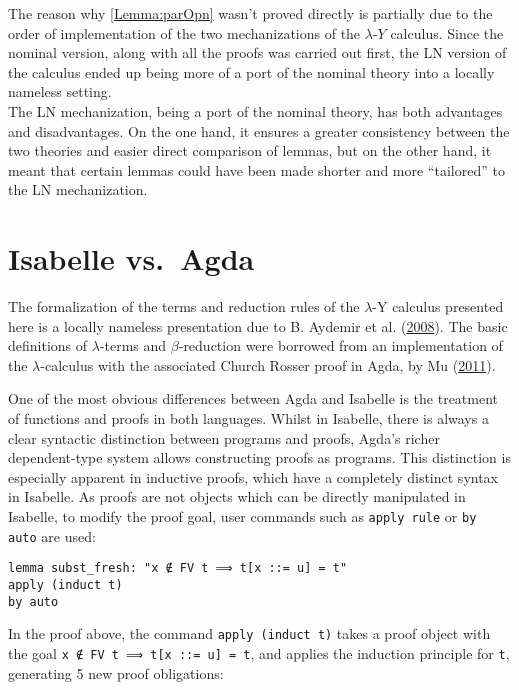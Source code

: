 \documentclass[a4paper, 12pt, twoside]{style/ociamthesis}
\theoremstyle{plain}
\theoremstyle{definition}
\theoremstyle{remark}
\newcommand{\lamy}{\lambda\text{-}Y}
\begin{document}
The reason why \cref{Lemma:parOpn} wasn't proved directly is partially
due to the order of implementation of the two mechanizations of the
\(\lamy\) calculus. Since the nominal version, along with all the proofs
was carried out first, the LN version of the calculus ended up being
more of a port of the nominal theory into a locally nameless setting.\\
The LN mechanization, being a port of the nominal theory, has both
advantages and disadvantages. On the one hand, it ensures a greater
consistency between the two theories and easier direct comparison of
lemmas, but on the other hand, it meant that certain lemmas could have
been made shorter and more ``tailored'' to the LN mechanization.

\chapter{Isabelle vs.~Agda}\label{comp-agda}

\label{chap:compAgda}

The formalization of the terms and reduction rules of the \(\lambda\)-Y
calculus presented here is a locally nameless presentation due to B.
Aydemir et al. (\protect\hyperlink{ref-aydemir08}{2008}). The basic
definitions of \(\lambda\)-terms and \(\beta\)-reduction were borrowed
from an implementation of the \(\lambda\)-calculus with the associated
Church Rosser proof in Agda, by Mu
(\protect\hyperlink{ref-shing-cheng}{2011}).

One of the most obvious differences between Agda and Isabelle is the
treatment of functions and proofs in both languages. Whilst in Isabelle,
there is always a clear syntactic distinction between programs and
proofs, Agda's richer dependent-type system allows constructing proofs
as programs. This distinction is especially apparent in inductive
proofs, which have a completely distinct syntax in Isabelle. As proofs
are not objects which can be directly manipulated in Isabelle, to modify
the proof goal, user commands such as \texttt{apply rule} or
\texttt{by auto} are used:

\begin{verbatim}
lemma subst_fresh: "x ∉ FV t ⟹ t[x ::= u] = t"
apply (induct t)
by auto
\end{verbatim}

In the proof above, the command \texttt{apply (induct t)} takes a proof
object with the goal \texttt{x ∉ FV t ⟹ t[x ::= u] = t}, and applies the
induction principle for \texttt{t}, generating 5 new proof obligations:
\end{document}
